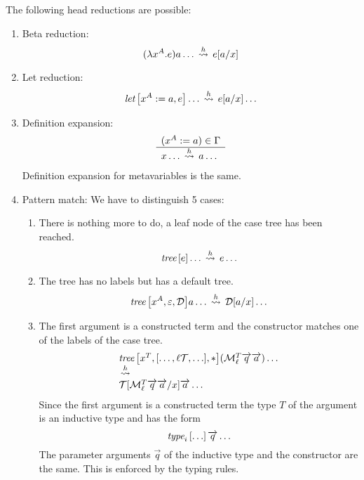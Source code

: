 The following head reductions are possible:
\begin{enumerate}
    \item Beta reduction:
        $$
        (\lambda x^A . e) a \ldots
        \,\stackrel{h}{\leadsto}\,
        e[a/x]
        $$



    \item Let reduction:
        $$
            {\text{\it let}}\left[ {x^A := a, e} \right] \ldots
            \,\stackrel{h}{\leadsto}\,
            e[a/x] \ldots
        $$



    \item Definition expansion:
        $$
        \begin{array}{l} 
            (x^A := a) \in \Gamma
         \\ \hline 
            x \ldots \,\stackrel{h}{\leadsto}\, a \ldots
         \end{array}
        $$
        Definition expansion for metavariables is the same.



    \item Pattern match:
        We have to distinguish 5 cases:
        \begin{enumerate}
            \item There is nothing more to do, a leaf node of the case tree has
                been reached.
                $$
                {{\text{\it tree}}\left[ {e} \right]} \ldots
                \,\stackrel{h}{\leadsto}\,
                e \ldots
                $$

            \item The tree has no labels but has a default tree.
                $$
                {{\text{\it tree}}\left[ {x^A, \varepsilon, {\mathcal D}} \right]} a \ldots
                \,\stackrel{h}{\leadsto}\,
                {\mathcal D}[a/x] \ldots
                $$

            \item The first argument is a constructed term and the constructor
                matches one of the labels of the case tree.
                $$
                \begin{array}{lllll} 
                    {{\text{\it tree}}\left[ {x^T, [\ldots, \ell {\mathcal T}, \ldots], *} \right]}
                        ({\cal M}^T_\ell {\overrightarrow {q}} {\overrightarrow {a}})
                        \ldots
                    \\ \,\stackrel{h}{\leadsto}\, \\
                    {\mathcal T}[{\cal M}^T_\ell {\overrightarrow {q}} {\overrightarrow {a}} / x]
                        {\overrightarrow {a}}
                        \ldots
                 \end{array}
                $$
                Since the first argument is a constructed term the type $T$ of
                the argument is an inductive type and has the form
                $$
                {\text{\it type}}_i \left[ {\ldots} \right] {\overrightarrow {q}} \ldots
                $$
                The parameter arguments
                $\vec q$ of the inductive type and the constructor are the same.
                This is enforced by the typing rules.


\end{enumerate}
\end{enumerate}
